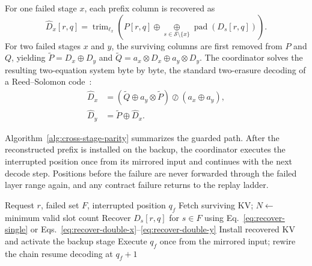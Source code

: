 For one failed stage $x$, each prefix column is recovered as
\begin{equation}\label{eq:recover-single}
  \widehat{D}_x[r,q] = \operatorname{trim}_{\ell_x}\!\left(
  P[r,q]\oplus\!\mathop{\oplus}\limits_{s\in\mathcal{S}\setminus\{x\}}
  \operatorname{pad}\!\left(D_s[r,q]\right)\right).
\end{equation}
For two failed stages $x$ and $y$, the surviving columns are first removed
from $P$ and $Q$, yielding
$\widetilde{P}=D_x\oplus D_y$ and
$\widetilde{Q}=a_x\otimes D_x\oplus a_y\otimes D_y$.  The coordinator solves
the resulting two-equation system byte by byte, the standard two-erasure
decoding of a Reed--Solomon code~\cite{plank1997tutorial}:
\begin{align}
  \widehat{D}_x &=(\widetilde{Q}\oplus
    a_y\otimes\widetilde{P})\oslash(a_x\oplus a_y),
    \label{eq:recover-double-x}\\
  \widehat{D}_y &=\widetilde{P}\oplus\widehat{D}_x.
    \label{eq:recover-double-y}
\end{align}

Algorithm~\ref{alg:cross-stage-parity} summarizes the guarded path.  After
the reconstructed prefix is installed on the backup, the coordinator executes
the interrupted position once from its mirrored input and continues with the next decode step.  Positions before the failure are never forwarded through
the failed layer range again, and any contract failure returns to the replay
ladder.

\begin{algorithm}[t]
  \caption{Guarded cross-stage parity recovery}
  \label{alg:cross-stage-parity}
  \begin{algorithmic}[1]
    \Require Request $r$, failed set $F$, interrupted position $q_f$
      \State \Return {}
    \EndIf
    \State Fetch surviving KV; $N\gets$ minimum valid slot count
      \State \Return {}
    \EndIf
      \State Recover $D_s[r,q]$ for $s\in F$ using
      Eq.~\ref{eq:recover-single} or Eqs.~\ref{eq:recover-double-x}--\ref{eq:recover-double-y}
    \EndFor
    \State Install recovered KV and activate the backup stage
    \State Execute $q_f$ once from the mirrored input; rewire the chain
    \State \Return resume decoding at $q_f+1$
  \end{algorithmic}
\end{algorithm}


